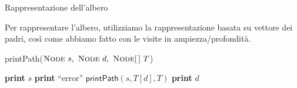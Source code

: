\begin{frame}{Rappresentazione dell'albero}

Per rappresentare l'albero, utilizziamo la rappresentazione basata su vettore dei padri,
così come abbiamo fatto con le visite in ampiezza/profondità.

\bigskip
\begin{Procedure}
\caption[A]{\textsf{printPath}($\Node\ s,\ \Node\ d,\ \Node[\,]\ T$)}

{
  \textbf{print} $s$
}
{
  \textbf{print} “error”\;
}
\Else
{
  $\textsf{printPath}(s, T[d], T)$\;
  \textbf{print} $d$
}
\end{Procedure}

\end{frame}



